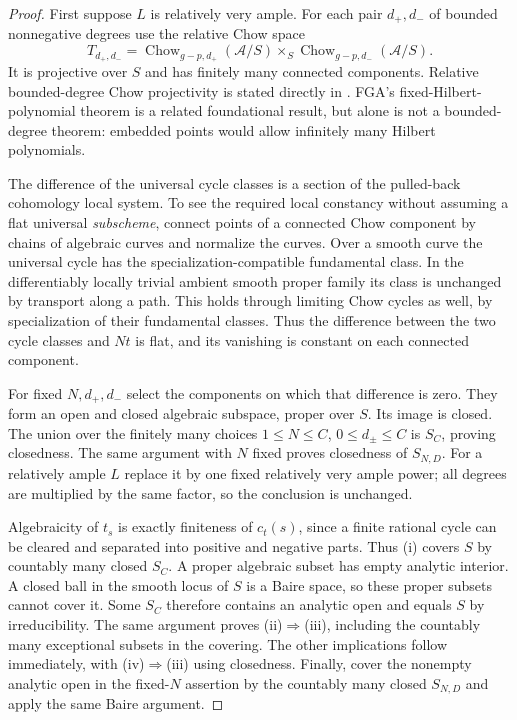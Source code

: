 \documentclass[11pt,a4paper]{article}
\theoremstyle{definition}\newtheorem{definition}[theorem]{Definition}
\theoremstyle{remark}\newtheorem{remark}[theorem]{Remark}
\begin{document}
\begin{proof}
First suppose $L$ is relatively very ample. For each pair $d_+,d_-$ of bounded nonnegative degrees use the relative Chow space
\[
 T_{d_+,d_-}=\operatorname{Chow}_{g-p,d_+}(\mathcal A/S)
 \mathop{\times}_S\operatorname{Chow}_{g-p,d_-}(\mathcal A/S).
\]
It is projective over $S$ and has finitely many connected components. Relative bounded-degree Chow projectivity is stated directly in \citet[Definition~3.21, (3.21.1)--(3.21.2), p.~119]{Kollar18}. FGA's fixed-Hilbert-polynomial theorem is a related foundational result, but alone is not a bounded-degree theorem: embedded points would allow infinitely many Hilbert polynomials.

The difference of the universal cycle classes is a section of the pulled-back cohomology local system. To see the required local constancy without assuming a flat universal \emph{subscheme}, connect points of a connected Chow component by chains of algebraic curves and normalize the curves. Over a smooth curve the universal cycle has the specialization-compatible fundamental class. In the differentiably locally trivial ambient smooth proper family its class is unchanged by transport along a path. This holds through limiting Chow cycles as well, by specialization of their fundamental classes. Thus the difference between the two cycle classes and $Nt$ is flat, and its vanishing is constant on each connected component.

For fixed $N,d_+,d_-$ select the components on which that difference is zero. They form an open and closed algebraic subspace, proper over $S$. Its image is closed. The union over the finitely many choices $1\le N\le C$, $0\le d_\pm\le C$ is $S_C$, proving closedness. The same argument with $N$ fixed proves closedness of $S_{N,D}$. For a relatively ample $L$ replace it by one fixed relatively very ample power; all degrees are multiplied by the same factor, so the conclusion is unchanged.

Algebraicity of $t_s$ is exactly finiteness of $c_t(s)$, since a finite rational cycle can be cleared and separated into positive and negative parts. Thus (i) covers $S$ by countably many closed $S_C$. A proper algebraic subset has empty analytic interior. A closed ball in the smooth locus of $S$ is a Baire space, so these proper subsets cannot cover it. Some $S_C$ therefore contains an analytic open and equals $S$ by irreducibility. The same argument proves (ii)$\Rightarrow$(iii), including the countably many exceptional subsets in the covering. The other implications follow immediately, with (iv)$\Rightarrow$(iii) using closedness. Finally, cover the nonempty analytic open in the fixed-$N$ assertion by the countably many closed $S_{N,D}$ and apply the same Baire argument.
\end{proof}
\end{document}
